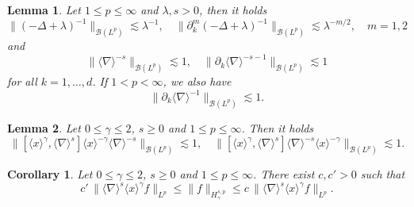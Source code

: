 \documentclass[10pt,a4paper]{amsart}
\newtheorem{lemma}{Lemma}
\newtheorem{cor}{Corollary}
\begin{document}
	\begin{lemma}
	\label{lemma: resolvent Lp}
	    Let $1\leq p\leq \infty$ and $\lambda,s >0$, then it holds 
	    \begin{equation}\label{eq:bound-resolv_Lp}
	        \|(-\Delta + \lambda )^{-1} \|_{\mathcal{B}(L^p)} \lesssim \lambda^{-1}, \quad  \|\partial_k^m(-\Delta + \lambda )^{-1} \|_{\mathcal{B}(L^p)} \lesssim \lambda^{-m/2}, \quad m =1,2 
	    \end{equation}
	    and 
	    \begin{equation}\label{eq:bound-bessel_Lp}
	        \|\langle \nabla \rangle^{-s}\|_{\mathcal{B}(L^p)} \lesssim 1 , \quad \|\partial_k \langle \nabla \rangle^{-s-1}\|_{\mathcal{B}(L^p)} \lesssim 1
	    \end{equation}
	    for all $k =1,\dots,d$. If $1<p<\infty$, we also have
	    \begin{equation}\label{eq:bound-bessel2_Lp}
	        \|\partial_k \langle \nabla \rangle^{-1}\|_{\mathcal{B}(L^p)} \lesssim 1.
	    \end{equation}
	\end{lemma}

\begin{lemma}
\label{lemma: [x^gamma, grad^s]}
    Let $0\leq \gamma\leq 2$,  $s\geq 0$ and $1\leq p \leq \infty$. Then it holds 
    \begin{equation*}
        \|[\langle x \rangle^\gamma , \langle \nabla \rangle^s]\langle x \rangle^{-\gamma} \langle \nabla \rangle^{-s} \|_{\mathcal{B}(L^p)}\lesssim 1, \quad \|[\langle x \rangle^\gamma , \langle \nabla \rangle^s]\langle \nabla \rangle^{-s}   \langle x \rangle^{-\gamma} \|_{\mathcal{B}(L^p)}\lesssim 1 .
    \end{equation*}
\end{lemma}

\begin{cor}\label{cor:weighted-sobolev}
 Let $0\leq \gamma\leq 2$,  $s\geq 0$ and $1\leq p \leq \infty$. There exist $c, c'>0$ such that 
 \begin{equation*}
    c'\,  \| \langle \nabla \rangle^s \langle x \rangle^\gamma f \|_{L^p} \leq   \| f \|_{H_\gamma^{s,p}} \leq c\,  \| \langle \nabla \rangle^s \langle x \rangle^\gamma f \|_{L^p} . 
 \end{equation*}
\end{cor}
\end{document}
